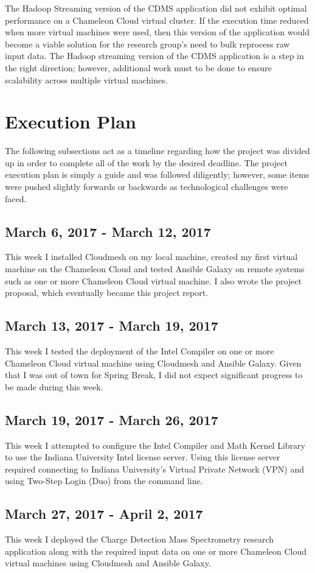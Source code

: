 \documentclass[9pt,twocolumn,twoside]{../../styles/osajnl}
\begin{document}
The Hadoop Streaming version of the CDMS application did not exhibit
optimal performance on a Chameleon Cloud virtual cluster. If the
execution time reduced when more virtual machines were used, then this
version of the application would become a viable solution for the
research group's need to bulk reprocess raw input data. The Hadoop
streaming version of the CDMS application is a step in the right
direction; however, additional work must to be done to ensure
scalability across multiple virtual machines.

\section{Execution Plan} \label{plan}
The following subsections act as a timeline regarding how the project
was divided up in order to complete all of the work by the desired
deadline. The project execution plan is simply a guide and was
followed diligently; however, some items were pushed slightly forwards
or backwards as technological challenges were faced.
\subsection{March 6, 2017 - March 12, 2017}
This week I installed Cloudmesh on my local machine, created my first
virtual machine on the Chameleon Cloud and tested Ansible Galaxy on
remote systems such as one or more Chameleon Cloud virtual machine. I
also wrote the project proposal, which eventually became this project
report.
\subsection{March 13, 2017 - March 19, 2017}
This week I tested the deployment of the Intel Compiler on one or more
Chameleon Cloud virtual machine using Cloudmesh and Ansible
Galaxy. Given that I was out of town for Spring Break, I did not
expect significant progress to be made during this week.
\subsection{March 19, 2017 - March 26, 2017}
This week I attempted to configure the Intel Compiler and Math Kernel
Library to use the Indiana University Intel license server. Using this
license server required connecting to Indiana University's Virtual
Private Network (VPN) and using Two-Step Login (Duo) from the command
line.
\subsection{March 27, 2017 - April 2, 2017}
This week I deployed the Charge Detection Mass Spectrometry research
application along with the required input data on one or more
Chameleon Cloud virtual machines using Cloudmesh and Ansible Galaxy.
\end{document}

